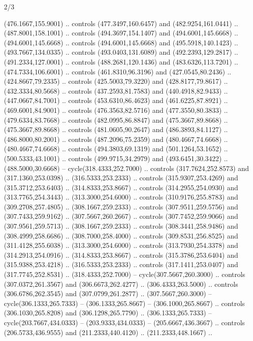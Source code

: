 \begin{flagdescription}{2/3}
\begin{scope}[xshift=0.5\flaglength,yshift=0.5\flagwidth,scale=\flagwidth/525.28]
\begin{scope}[y=0.1mm, x=0.1mm, yscale=-1,shift={(-381.5,-404)}]
\begin{scope}[shift={(5.25001,4.53053)},miter limit=4.00,line width=0.800\lw]
  (476.1667,155.9001) .. controls (477.3497,160.6457) and (482.9254,161.0441) ..
  (487.8001,158.1001) .. controls (494.3697,154.1407) and (494.6001,145.6668) ..
  (494.6001,145.6668) .. controls (494.6001,145.6668) and (495.5918,140.1423) ..
  (493.7667,134.0335) .. controls (493.0403,131.6089) and (492.2393,129.2817) ..
  (491.2334,127.0001) .. controls (488.2681,120.1436) and (483.6326,113.7201) ..
  (474.7334,106.6001) .. controls (461.8310,96.3196) and (427.0545,80.2436) ..
  (424.8667,79.2335) .. controls (425.5003,79.3220) and (428.8177,79.8617) ..
  (432.3334,80.5668) .. controls (437.2593,81.7583) and (440.4918,82.9433) ..
  (447.0667,84.7001) .. controls (453.6310,86.4623) and (461.6225,87.8921) ..
  (469.6001,84.9001) .. controls (476.3563,82.5716) and (477.3550,80.3833) ..
  (479.6334,83.7668) .. controls (482.0995,86.8847) and (475.3667,89.8668) ..
  (475.3667,89.8668) .. controls (481.0605,90.2647) and (486.3893,84.1127) ..
  (486.8000,80.2001) .. controls (487.2096,75.2359) and (480.4667,74.6668) ..
  (480.4667,74.6668) .. controls (494.3803,69.1319) and (501.1264,53.1652) ..
  (500.5333,43.1001) .. controls (499.9715,34.2979) and (493.6451,30.3422) ..
  (488.5000,30.6668) -- cycle(318.4333,252.7000) .. controls (317.7624,252.8573)
  and (317.1360,253.0398) .. (316.5333,253.2333) .. controls (315.9307,253.4269)
  and (315.3712,253.6403) .. (314.8333,253.8667) .. controls (314.2955,254.0930)
  and (313.7765,254.3443) .. (313.3000,254.6000) .. controls (310.9176,255.8783)
  and (309.2708,257.4805) .. (308.1667,259.2333) .. controls (307.9511,259.5756)
  and (307.7433,259.9162) .. (307.5667,260.2667) .. controls (307.7452,259.9066)
  and (307.9561,259.5713) .. (308.1667,259.2333) .. controls (308.3441,258.9486)
  and (308.4999,258.6686) .. (308.7000,258.4000) .. controls (309.8531,256.8525)
  and (311.4128,255.6038) .. (313.3000,254.6000) .. controls (313.7930,254.3378)
  and (314.2913,254.0916) .. (314.8333,253.8667) .. controls (315.3786,253.6404)
  and (315.9388,253.4218) .. (316.5333,253.2333) .. controls (317.1411,253.0407)
  and (317.7745,252.8531) .. (318.4333,252.7000) -- cycle(307.5667,260.3000) ..
  controls (307.0372,261.3567) and (306.6673,262.4277) .. (306.4333,263.5000) ..
  controls (306.6786,262.3545) and (307.0799,261.2877) .. (307.5667,260.3000) --
  cycle(306.1333,265.7333) -- (306.1333,265.8667) -- (306.1000,265.8667) ..
  controls (306.1030,265.8208) and (306.1298,265.7790) .. (306.1333,265.7333) --
  cycle(203.7667,434.0333) -- (203.9333,434.0333) -- (205.6667,436.3667) ..
  controls (206.5733,436.9555) and (211.2333,440.4120) .. (211.2333,448.1667) ..

\end{scope}
\end{scope}
\end{scope}
\end{flagdescription}
